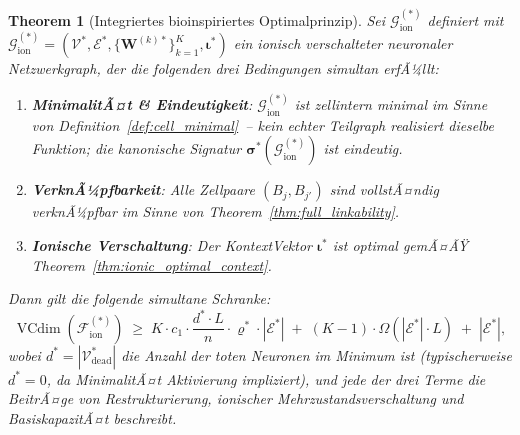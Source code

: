 ﻿\documentclass[12pt, a4paper, openany]{report}
\newtheorem{theorem}{Theorem}[chapter]
\newcommand{\calG}{\mathcal{G}}
\newcommand{\calV}{\mathcal{V}}
\newcommand{\calE}{\mathcal{E}}
\newcommand{\calF}{\mathcal{F}}
\DeclareMathOperator{\VC}{VCdim}
\begin{document}
\begin{theorem}[Integriertes bioinspiriertes Optimalprinzip]
\label{thm:bio_master}
Sei  $\calG_{\mathrm{ion}}^{(*)}$ definiert mit $\calG_{\mathrm{ion}}^{(*)} = (\calV^*, \calE^*, \{\bm{W}^{(k)*}\}_{k=1}^K, \bm{\iota}^*)$
ein ionisch verschalteter neuronaler Netzwerkgraph, der die folgenden
drei Bedingungen simultan erfÃ¼llt:
\begin{enumerate}[label=(\Roman*)]
  \item \textbf{MinimalitÃ¤t \& Eindeutigkeit}: $\calG_{\mathrm{ion}}^{(*)}$ ist
    zellintern minimal im Sinne von Definition~\ref{def:cell_minimal}~--
    kein echter Teilgraph realisiert dieselbe Funktion; die kanonische
    Signatur $\bm{\sigma}^*(\calG_{\mathrm{ion}}^{(*)})$ ist eindeutig.
  \item \textbf{VerknÃ¼pfbarkeit}: Alle Zellpaare $(B_j, B_{j'})$ sind
    vollstÃ¤ndig verknÃ¼pfbar im Sinne von Theorem~\ref{thm:full_linkability}.
  \item \textbf{Ionische Verschaltung}: Der KontextVektor $\bm{\iota}^*$ ist
    optimal gemÃ¤ÃŸ Theorem~\ref{thm:ionic_optimal_context}.
\end{enumerate}
Dann gilt die folgende simultane Schranke:
\begin{equation}
  \label{eq:bio_master_eq}
  \VC(\calF_{\mathrm{ion}}^{(*)})
  \;\geq\;
  K \cdot c_1 \cdot \frac{d^* \cdot L}{n} \cdot \varrho^* \cdot |\calE^*|
  \;+\;
  (K-1) \cdot \Omega(|\calE^*| \cdot L)
  \;+\;
  |\calE^*|,
\end{equation}
wobei $d^* = |\calV^*_{\mathrm{dead}}|$ die Anzahl der toten Neuronen im
Minimum ist (typischerweise $d^* = 0$, da MinimalitÃ¤t Aktivierung impliziert),
und jede der drei Terme die BeitrÃ¤ge von Restrukturierung, ionischer
Mehrzustandsverschaltung und BasiskapazitÃ¤t beschreibt.
\end{theorem}
\end{document}
